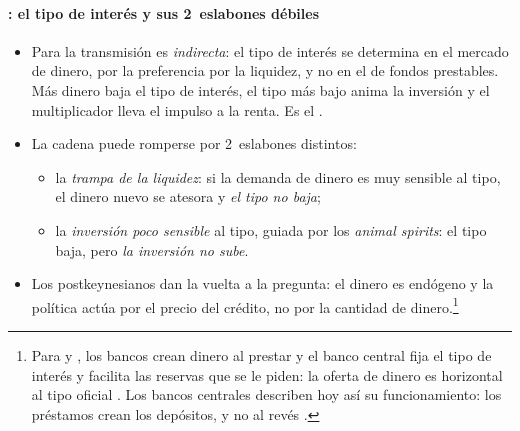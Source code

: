 \documentclass[11pt]{article}
\begin{document}
\paragraph{: el tipo de interés y sus 2~eslabones débiles}
\begin{itemize}
\item Para \textcite{Keynes1936} la transmisión es \emph{indirecta}: el tipo de interés se determina en el mercado de dinero, por la preferencia por la liquidez, y no en el de fondos prestables. Más dinero baja el tipo de interés, el tipo más bajo anima la inversión y el multiplicador lleva el impulso a la renta. Es el .
\item La cadena puede romperse por 2~eslabones distintos:
  \begin{itemize}
  \item la \emph{trampa de la liquidez}: si la demanda de dinero es muy sensible al tipo, el dinero nuevo se atesora y \emph{el tipo no baja};
  \item la \emph{inversión poco sensible} al tipo, guiada por los \emph{animal spirits}: el tipo baja, pero \emph{la inversión no sube}.
  \end{itemize}
\item Los postkeynesianos dan la vuelta a la pregunta: el dinero es endógeno y la política actúa por el precio del crédito, no por la cantidad de dinero.\footnote{Para \textcite{Kaldor1982Scourge} y \textcite{Moore1988Horizontalists}, los bancos crean dinero al prestar y el banco central fija el tipo de interés y facilita las reservas que se le piden: la oferta de dinero es horizontal al tipo oficial . Los bancos centrales describen hoy así su funcionamiento: los préstamos crean los depósitos, y no al revés\nocite{McLeayRadiaThomas2014Money} .}
\end{itemize}
\end{document}

